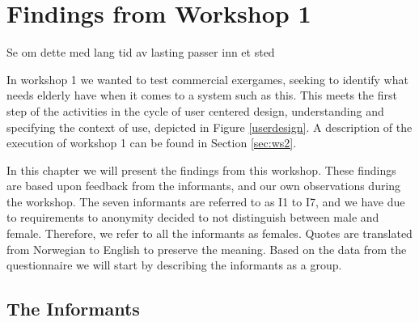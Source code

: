\chapter{Findings from Workshop 1}
\label{chap:findW1}

Se om dette med lang tid av lasting passer inn et sted

In workshop 1 we wanted to test commercial exergames, seeking to identify what needs elderly have when it comes to a system such as this. This meets the first step of the activities in the cycle of user centered design, understanding and specifying the context of use, depicted in Figure \ref{userdesign}. A description of the execution of workshop 1 can be found in Section \ref{sec:ws2}. 

In this chapter we will present the findings from this workshop. These findings are based upon feedback from the informants, and our own observations during the workshop. The seven informants are referred to as I1 to I7, and we have due to requirements to anonymity decided to not distinguish between male and female. Therefore, we refer to all the informants as females. Quotes are translated from Norwegian to English to  preserve the meaning. Based on the data from the questionnaire we will start by describing the informants as a group.

\section{The Informants}


